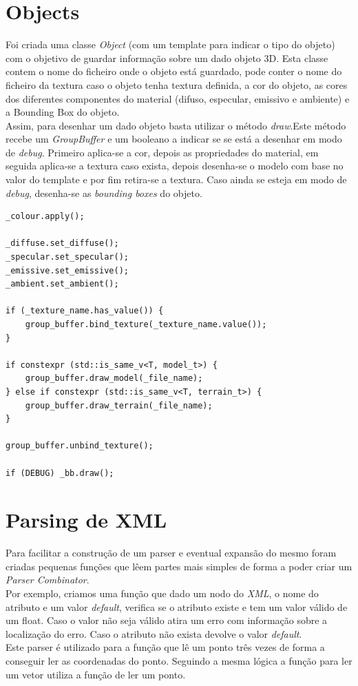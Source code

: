 \documentclass[a4paper]{report}
\begin{document}
\section{Objects}
Foi criada uma classe \textit{Object} (com um template para indicar o tipo do
objeto) com o objetivo de guardar informação sobre um dado objeto 3D. Esta
classe contem o nome do ficheiro onde o objeto está guardado, pode conter o nome
do ficheiro da textura caso o objeto tenha textura definida, a cor do objeto, as
cores dos diferentes componentes do material (difuso, especular, emissivo e
ambiente) e a Bounding Box do objeto.\\
Assim, para desenhar um dado objeto basta utilizar o método \textit{draw}.Este
método recebe um \textit{GroupBuffer} e um booleano a indicar se se está a
desenhar em modo de \textit{debug}. Primeiro aplica-se a cor, depois as
propriedades do material, em seguida aplica-se a textura caso exista, depois
desenha-se o modelo com base no valor do template e por fim retira-se a textura.
Caso ainda se esteja em modo de \textit{debug}, desenha-se as \textit{bounding
boxes} do objeto.
\begin{lstlisting}
_colour.apply();

_diffuse.set_diffuse();
_specular.set_specular();
_emissive.set_emissive();
_ambient.set_ambient();

if (_texture_name.has_value()) {
    group_buffer.bind_texture(_texture_name.value());
}

if constexpr (std::is_same_v<T, model_t>) {
    group_buffer.draw_model(_file_name);
} else if constexpr (std::is_same_v<T, terrain_t>) {
    group_buffer.draw_terrain(_file_name);
}

group_buffer.unbind_texture();

if (DEBUG) _bb.draw();
\end{lstlisting}

\section{Parsing de XML}
Para facilitar a construção de um parser e eventual expansão do mesmo foram
criadas pequenas funções que lêem partes mais simples de forma a poder criar um
\textit{Parser Combinator}.\\
Por exemplo, criamos uma função que dado um nodo do \textit{XML}, o nome do
atributo e um valor \textit{default}, verifica se o atributo existe e tem um
valor válido de um float. Caso o valor não seja válido atira um erro com
informação sobre a localização do erro. Caso o atributo não exista devolve o
valor \textit{default}.\\
Este parser é utilizado para a função que lê um ponto três vezes de forma a
conseguir ler as coordenadas do ponto. Seguindo a mesma lógica a função para ler
um vetor utiliza a função de ler um ponto.\\
\end{document}
